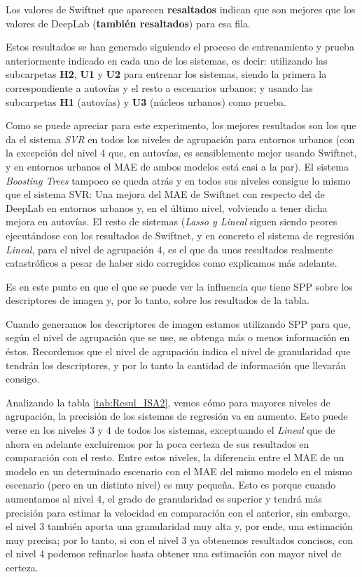 Los valores de Swiftnet que aparecen \textbf{resaltados} indican que son mejores que los valores de DeepLab (\textbf{también resaltados}) para esa fila.

Estos resultados se han generado siguiendo el proceso de entrenamiento y prueba anteriormente indicado en cada uno de los sistemas, es decir: utilizando las subcarpetas \textbf{H2}, \textbf{U1} y \textbf{U2} para entrenar los sistemas, siendo la primera la correspondiente a autovías y el resto a escenarios urbanos; y usando las subcarpetas \textbf{H1} (autovías) y \textbf{U3} (núcleos urbanos) como prueba.

Como se puede apreciar para este experimento, los mejores resultados son los que da el sistema \textit{\ac{SVR}} en todos los niveles de agrupación para entornos urbanos (con la excepción del nivel 4 que, en autovías, es sensiblemente mejor usando Swiftnet, y en entornos urbanos el \ac{MAE} de ambos modelos está casi a la par). El sistema \textit{Boosting Trees} tampoco se queda atrás y en todos sus niveles consigue lo mismo que el sistema \ac{SVR}: Una mejora del \ac{MAE} de Swiftnet con respecto del de DeepLab en entornos urbanos y, en el último nivel, volviendo a tener dicha mejora en autovías. El resto de sistemas (\textit{Lasso y Lineal} siguen siendo peores ejecutándose con los resultados de Swiftnet, y en concreto el sistema de regresión \textit{Lineal}, para el nivel de agrupación 4, es el que da unos resultados realmente catastróficos a pesar de haber sido corregidos como explicamos más adelante.%

Es en este punto en que el que se puede ver la influencia que tiene \ac{SPP} sobre los descriptores de imagen y, por lo tanto, sobre los resultados de la tabla. 

Cuando generamos los descriptores de imagen estamos utilizando \ac{SPP} para que, según el nivel de agrupación que se use, se obtenga más o menos información en éstos. Recordemos que el nivel de agrupación indica el nivel de granularidad que tendrán los descriptores, y por lo tanto la cantidad de información que llevarán consigo.

Analizando la tabla \ref{tab:Resul_ISA2}, vemos cómo para mayores niveles de agrupación, la precisión de los sistemas de regresión va en aumento. Esto puede verse en los niveles 3 y 4 de todos los sistemas, exceptuando el \textit{Lineal} que de ahora en adelante excluiremos por la poca certeza de sus resultados en comparación con el resto. Entre estos niveles, la diferencia entre el \ac{MAE} de un modelo en un determinado escenario con el \ac{MAE} del mismo modelo en el mismo escenario (pero en un distinto nivel) es muy pequeña. Esto es porque cuando aumentamos al nivel 4, el grado de granularidad es superior y tendrá más precisión para estimar la velocidad en comparación con el anterior, sin embargo, el nivel 3 también aporta una granularidad muy alta y, por ende, una estimación muy precisa; por lo tanto, si con el nivel 3 ya obtenemos resultados concisos, con el nivel 4 podemos refinarlos hasta obtener una estimación con mayor nivel de certeza.

